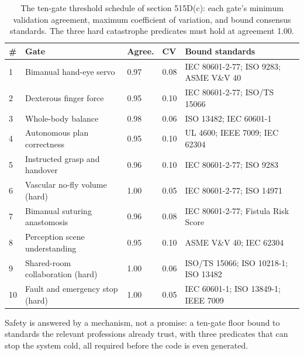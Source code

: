 \begin{table}[H]
\footnotesize
\begin{tabularx}{\textwidth}{@{}L{0.55cm} L{3.75cm} C{1.35cm} C{0.95cm} Y@{}}
\toprule
\textbf{\#} & \textbf{Gate} & \textbf{Agree.} & \textbf{CV} & \textbf{Bound standards}\\
 & Bimanual hand-eye servo & 0.97 & 0.08 & IEC 80601-2-77; ISO 9283; ASME V\&V 40\\
2 & Dexterous finger force & 0.95 & 0.10 & IEC 80601-2-77; ISO/TS 15066\\
3 & Whole-body balance & 0.98 & 0.06 & ISO 13482; IEC 60601-1\\
4 & Autonomous plan correctness & 0.95 & 0.10 & UL 4600; IEEE 7009; IEC 62304\\
5 & Instructed grasp and handover & 0.96 & 0.10 & IEC 80601-2-77; ISO 9283\\
6 & Vascular no-fly volume (hard) & 1.00 & 0.05 & IEC 80601-2-77; ISO 14971\\
7 & Bimanual suturing anastomosis & 0.96 & 0.08 & IEC 80601-2-77; Fistula Risk Score\\
8 & Perception scene understanding & 0.95 & 0.10 & ASME V\&V 40; IEC 62304\\
9 & Shared-room collaboration (hard) & 1.00 & 0.06 & ISO/TS 15066; ISO 10218-1; ISO 13482\\
10 & Fault and emergency stop (hard) & 1.00 & 0.05 & IEC 60601-1; ISO 13849-1; IEEE 7009\\
\bottomrule
\end{tabularx}
\caption{The ten-gate threshold schedule of section 515D(c): each gate's minimum
validation agreement, maximum coefficient of variation, and bound consensus
standards. The three hard catastrophe predicates must hold at agreement 1.00.}
\label{tab:gates}
\end{table}

Safety is answered by a mechanism, not a promise: a ten-gate floor bound to standards
the relevant professions already trust, with three predicates that can stop the
system cold, all required before the code is even generated.
